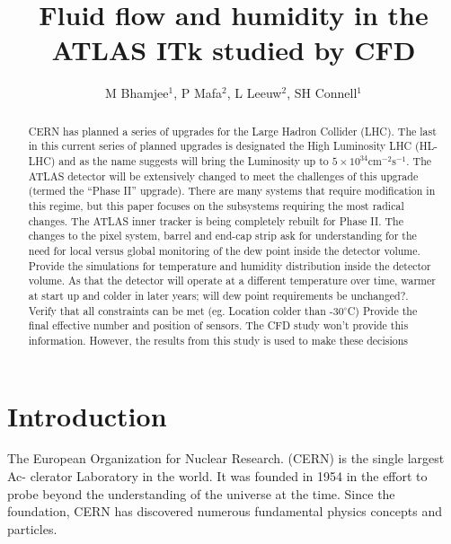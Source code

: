 \documentclass[a4paper]{jpconf}
\begin{document}
\title{Fluid flow and humidity in the ATLAS ITk studied by CFD}

\small{
\author{M Bhamjee$^{1}$, P Mafa$^{2}$, L Leeuw$^{2}$, SH Connell$^1$}

\address {
1. University of Johannesburg, Johannesburg, Mechanical Engineering, South Africa.\\
2. University of South Africa, Johannesburg, Physics, South Africa
}}
\normalsize

\vspace{-10pt}
\begin{abstract}
CERN has planned a series of upgrades for the Large Hadron Collider (LHC). The last
in this current series of planned upgrades is designated the High Luminosity LHC (HL-LHC) and
as the name suggests will bring the Luminosity up to $5 \times 10^{34} \mbox{cm}^{-2}\mbox{s}^{- 1}$. The ATLAS detector will be extensively changed to meet the challenges of this upgrade (termed the “Phase II” upgrade).
There are many systems that require modification in this regime, but this paper focuses on the
subsystems requiring the most radical changes. The ATLAS inner tracker is being completely rebuilt for Phase II. The changes to the pixel system, barrel and end-cap strip ask for understanding for the need for local versus global monitoring of the dew point inside the detector volume. Provide the simulations for temperature and humidity distribution inside the detector volume. As that the detector will operate at a different temperature over time, warmer at start up and colder in later years; will dew point requirements be unchanged?. Verify that all constraints can be met (eg. Location colder than -30$^{\circ}$C) Provide the final effective number and position of sensors.  The CFD study won’t provide this information. However, the results from this study is used to make these decisions
\end{abstract}
\vspace{-10pt}

\section{Introduction}
The European Organization for Nuclear Research. (CERN) is the single largest Ac-
clerator Laboratory in the world. It was founded in 1954 \cite{11} in the effort to probe
beyond the understanding of the universe at the time. Since the foundation, CERN
has discovered numerous fundamental physics concepts and particles. 
\end{document}
